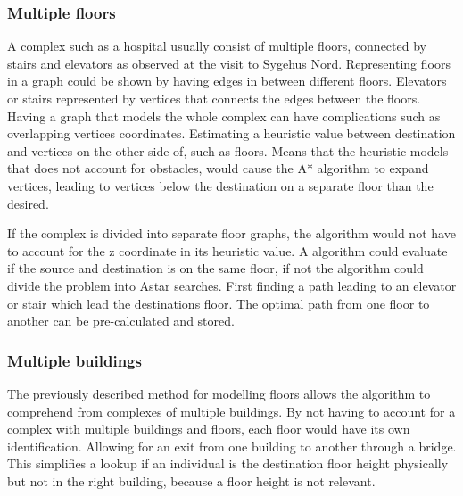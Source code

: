 
\subsubsection{Multiple floors}

A complex such as a hospital usually consist of multiple floors, connected by stairs and elevators as observed at the visit to Sygehus Nord. Representing floors in a graph could be shown by having edges in between different floors. Elevators or stairs represented by vertices that connects the edges between the floors. Having a graph that models the whole complex can have complications such as overlapping vertices coordinates. Estimating a heuristic value between destination and vertices on the other side of, such as floors. Means that the heuristic models that does not account for obstacles, would cause the A* algorithm to expand vertices, leading to vertices below the destination on a separate floor than the desired.


If the complex is divided into separate floor graphs, the algorithm would not have to account for the z coordinate in its heuristic value. A algorithm could evaluate if the source and destination is on the same floor, if not the algorithm could divide the problem into Astar searches. First finding a path leading to an elevator or stair which lead the destinations floor. The optimal path from one floor to another can be pre-calculated and stored. 


\subsubsection{Multiple buildings}

The previously described method for modelling floors allows the algorithm to comprehend from complexes of multiple buildings. By not having to account for a complex with multiple buildings and floors, each floor would have its own identification. Allowing for an exit from one building to another through a bridge. This simplifies a lookup if an individual is the destination floor height physically but not in the right building, because a floor height is not relevant.
